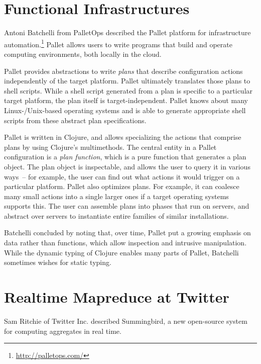 \documentclass{jfp1}
\begin{document}
\section{Functional Infrastructures}

Antoni Batchelli from PalletOps described the Pallet platform for
infrastructure automation.\footnote{\url{http://palletops.com/}}
Pallet allows users to write programs that build and operate computing
environments, both locally in the cloud.  

Pallet provides abstractions to write \textit{plans} that describe
configuration actions independently of the target platform.  Pallet
ultimately translates those plans to shell scripts.  While a shell
script generated from a plan is specific to a particular target
platform, the plan itself is target-independent.  Pallet knows about
many Linux-/Unix-based operating systems and is able to generate
appropriate shell scripts from these abstract plan specifications.

Pallet is written in Clojure, and allows specializing the actions that
comprise plans by using Clojure's multimethods.  The central entity in
a Pallet configuration is a \textit{plan function}, which is a pure
function that generates a plan object.  The plan object is
inspectable, and allows the user to query it in various ways~-- for
example, the user can find out what actions it would trigger on a
particular platform.  Pallet also optimizes plans.  For example, it
can coalesce many small actions into a single larger ones if a target
operating systems supports this.  The user can assemble plans into
phases that run on servers, and abstract over servers to instantiate
entire families of similar installations.

Batchelli concluded by noting that, over time, Pallet put a growing
emphasis on data rather than functions, which allow inspection and
intrusive manipulation.  While the dynamic typing of Clojure enables
many parts of Pallet, Batchelli sometimes wishes for static typing.


\section{Realtime Mapreduce at Twitter}


Sam Ritchie of Twitter Inc. described Summingbird, a new open-source
system for computing aggregates in real time.
\end{document}
